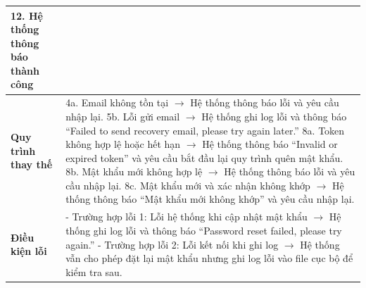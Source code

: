 \begin{longtable}{|p{}|p{}|}
12. Hệ thống thông báo thành công \\ \hline
\textbf{Quy trình thay thế} &
4a. Email không tồn tại $\rightarrow$ Hệ thống thông báo lỗi và yêu cầu nhập lại. \newline
5b. Lỗi gửi email $\rightarrow$ Hệ thống ghi log lỗi và thông báo “Failed to send recovery email, please try again later.” \newline
8a. Token không hợp lệ hoặc hết hạn $\rightarrow$ Hệ thống thông báo “Invalid or expired token” và yêu cầu bắt đầu lại quy trình quên mật khẩu. \newline
8b. Mật khẩu mới không hợp lệ $\rightarrow$ Hệ thống thông báo lỗi và yêu cầu nhập lại. \newline
8c. Mật khẩu mới và xác nhận không khớp $\rightarrow$ Hệ thống thông báo “Mật khẩu mới không khớp” và yêu cầu nhập lại. \\ \hline
\textbf{Điều kiện lỗi} &    
- Trường hợp lỗi 1: Lỗi hệ thống khi cập nhật mật khẩu $\rightarrow$ Hệ thống ghi log lỗi và thông báo “Password reset failed, please try again.” \newline
- Trường hợp lỗi 2: Lỗi kết nối khi ghi log $\rightarrow$ Hệ thống vẫn cho phép đặt lại mật khẩu nhưng ghi log lỗi vào file cục bộ để kiểm tra sau. \\ \hline
\end{longtable}

